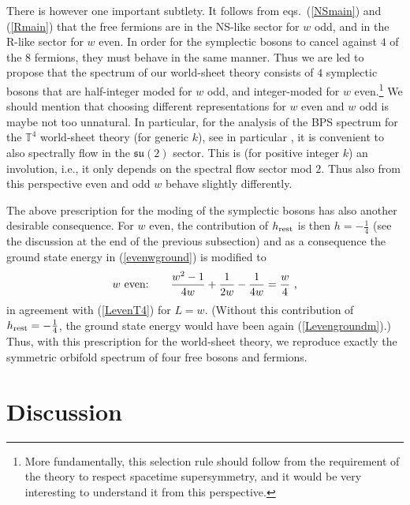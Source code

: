 \documentclass[12pt,a4paper]{article}
\newcommand{\be}{ \begin{equation}}
\newcommand{\ee}{\end{equation}}
\begin{document}
There is however one important subtlety. It follows from eqs.~(\ref{NSmain}) and (\ref{Rmain}) that the free fermions are in the NS-like sector for $w$ odd, and in the R-like sector for $w$ even. In order for the symplectic bosons to cancel against $4$ of the $8$ fermions, they must behave in the same manner. Thus we are led to propose that the spectrum of our world-sheet theory consists of $4$ symplectic bosons that are half-integer moded for $w$ odd, and integer-moded for $w$ even.\footnote{More fundamentally, this selection rule should follow from the requirement of the theory to respect spacetime supersymmetry, and it would be very interesting to understand it from this perspective.} We should mention that choosing different representations for $w$ even and $w$ odd is maybe not too unnatural. In particular,  for the analysis of the BPS spectrum for the $\mathbb{T}^4$ world-sheet theory (for generic $k$), see in particular \cite{Argurio:2000tb,Raju:2007uj}, it is convenient to also spectrally flow in the $\mathfrak{su}(2)$ sector. This is (for positive integer $k$) an involution, i.e., it only depends on the spectral flow sector mod $2$.  Thus also from this perspective even and odd $w$ behave slightly differently.

The above prescription for the moding of the symplectic bosons has also another desirable consequence. For $w$ even, the contribution of $h_{\rm rest}$ is then 
$h=-\frac{1}{4}$ (see the discussion at the end of the previous subsection) and as a consequence the ground state energy in (\ref{evenwground}) is modified to 
\be\label{groundevenT4}
\hbox{$w$ even:} \qquad \frac{w^2- 1}{4w} + \frac{1}{2w} - \frac{1}{4w}  = \frac{w}{4} \ ,
\ee
in agreement with (\ref{LevenT4}) for $L=w$. (Without this contribution of $h_{\rm rest}=-\frac{1}{4}$, the ground state energy would have been again (\ref{Levengroundm}).)
 Thus, with this prescription for the world-sheet theory, we reproduce exactly the symmetric orbifold spectrum of four free bosons and fermions.







\section{Discussion}\label{sec:concl}
\end{document}
